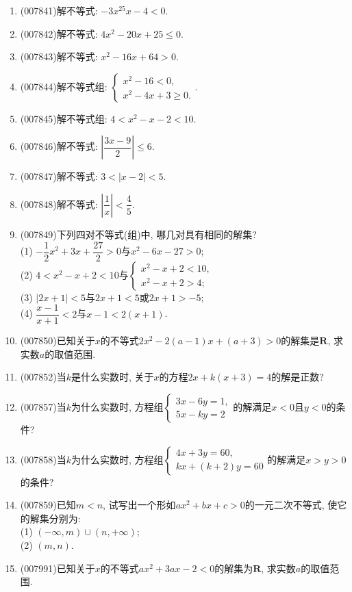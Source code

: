 \documentclass[10pt,a4paper]{article}
\begin{document}
\begin{enumerate}[1.]
\item {\tiny (007841)}解不等式: $-3x^25x-4<0$.
\item {\tiny (007842)}解不等式: $4x^2-20x+25\le 0$.
\item {\tiny (007843)}解不等式: $x^2-16x+64>0$.
\item {\tiny (007844)}解不等式组: $\begin{cases} x^2-16<0, \\ x^2-4x+3\ge 0. \end{cases}$.
\item {\tiny (007845)}解不等式组: $4<x^2-x-2<10$.
\item {\tiny (007846)}解不等式: $|\dfrac{3x-9}2|\le 6$.
\item {\tiny (007847)}解不等式: $3<|x-2|<5$.
\item {\tiny (007848)}解不等式: $|\dfrac 1x|<\dfrac 45$.
\item {\tiny (007849)}下列四对不等式(组)中, 哪几对具有相同的解集?\\
(1) $-\dfrac 12x^2+3x+\dfrac{27}2>0$与$x^2-6x-27>0$;\\
(2) $4<x^2-x+2<10$与$\begin{cases} x^2-x+2<10, \\ x^2-x+2>4; \end{cases}$\\
(3) $|2x+1|<5$与$2x+1<5$或$2x+1>-5$;\\
(4) $\dfrac{x-1}{x+1}<2$与$x-1<2(x+1)$.
\item {\tiny (007850)}已知关于$x$的不等式$2x^2-2(a-1)x+(a+3)>0$的解集是$\mathbf{R}$, 求实数$a$的取值范围.
\item {\tiny (007852)}当$k$是什么实数时, 关于$x$的方程$2x+k(x+3)=4$的解是正数?
\item {\tiny (007857)}当$k$为什么实数时, 方程组$\begin{cases} 3x-6y=1, \\ 5x-ky=2 \end{cases}$的解满足$x<0$且$y<0$的条件?
\item {\tiny (007858)}当$k$为什么实数时, 方程组$\begin{cases} 4x+3y=60, \\ kx+(k+2)y=60 \end{cases}$的解满足$x>y>0$的条件?
\item {\tiny (007859)}已知$m<n$, 试写出一个形如$ax^2+bx+c>0$的一元二次不等式, 使它的解集分别为:\\
(1) $(-\infty ,m)\cup (n,+\infty)$;\\
(2) $(m,n)$.
\item {\tiny (007991)}已知关于$x$的不等式$ax^2+3ax-2<0$的解集为$\mathbf{R}$, 求实数$a$的取值范围.

\end{enumerate}
\end{document}
